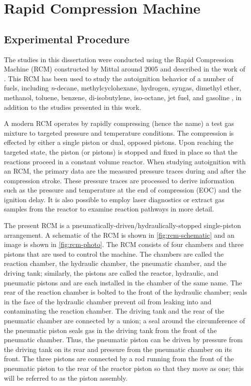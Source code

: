 \documentclass[../main.tex]{subfiles}
\begin{document}
\section{Rapid Compression Machine}
\label{sec:rcm}
\subsection{Experimental Procedure}
The studies in this dissertation were conducted using the Rapid
Compression Machine (RCM) constructed by Mittal around 2005 and described in the
work of \textcite{Mittal2007,Mittal2006a}. This RCM has been used to
study the autoignition behavior of a number of fuels, including
\textit{n}-decane, methylcyclohexane, hydrogen, syngas,
dimethyl ether, methanol, toluene, benzene, di-isobutylene, iso-octane,
jet fuel, and gasoline \cite{Kumar2009, Mittal2009, Das2012a, Mittal2006,
Das2012, Mittal2008a, Kumar2011a, Mittal2007a, Mittal2008, Kumar2010,
Dooley2010, Dooley2012, Hui2012a, Keromnes2013, Kukkadapu2013, Kukkadapu2012a},
in addition to the studies presented in this work.

A modern RCM operates by rapidly compressing (hence the name) a test gas
mixture to targeted pressure and temperature conditions. The compression
is effected by either a single piston or dual, opposed pistons. Upon
reaching the targeted state, the piston (or pistons) is stopped and
fixed in place so that the reactions proceed in a constant volume
reactor. When studying autoignition with an RCM, the primary data are
the measured pressure traces during and after the compression stroke.
These pressure traces are processed to derive information such as the
pressure and temperature at the end of compression (EOC) and the
ignition delay. It is also possible to employ laser diagnostics or
extract gas samples from the reactor to examine reaction pathways in
more detail.

The present RCM is a pneumatically-driven/hydraulically-stopped
single-piston arrangement. A schematic of the RCM is shown in
\cref{fig:rcm-schematic} and an image is shown in \cref{fig:rcm-photo}.
The RCM consists of four chambers and
three pistons that are used to control the machine. The chambers are
called the reaction chamber, the hydraulic chamber, the pneumatic
chamber, and the driving tank; similarly, the pistons are called
the reactor, hydraulic, and pneumatic pistons and are each installed
in the chamber of the same name. The rear of the reaction chamber
is bolted to the front of the hydraulic chamber; seals in the face
of the hydraulic chamber prevent oil from leaking into and contaminating
the reaction chamber. The driving tank and the rear of the pneumatic
chamber are connected by a union; a seal around the circumference of
the pneumatic piston seals gas in the driving tank from the front of
the pneumatic chamber. Thus, the pneumatic piston can be driven by
pressure from the driving tank on its rear and pressure from the
pneumatic chamber on its front. The three pistons are connected by
a rod running from the front of the pneumatic piston to the rear of
the reactor piston so that they move as one; this will be referred
to as the piston assembly.
\end{document}
